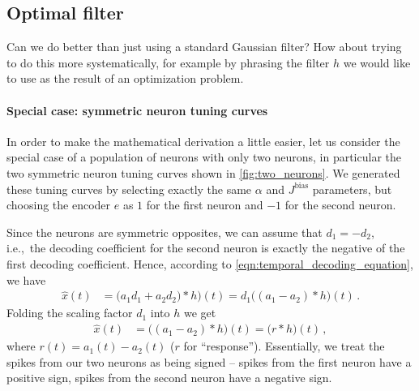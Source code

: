 \documentclass[10pt,letterpaper,oneside]{article}
\begin{document}
\subsection{Optimal filter}

Can we do better than just using a standard Gaussian filter? How about trying to do this more systematically, for example by phrasing the filter $h$ we would like to use as the result of an optimization problem.

\paragraph{Special case: symmetric neuron tuning curves}
In order to make the mathematical derivation a little easier, let us consider the special case of a population of neurons with only two neurons, in particular the two symmetric neuron tuning curves shown in \cref{fig:two_neurons}. We generated these tuning curves by selecting exactly the same $\alpha$ and $J^\mathrm{bias}$ parameters, but choosing the encoder $e$ as $1$ for the first neuron and $-1$ for the second neuron.

Since the neurons are symmetric opposites, we can assume that $d_1 = -d_2$, i.e.,~the decoding coefficient for the second neuron is exactly the negative of the first decoding coefficient. Hence, according to \cref{eqn:temporal_decoding_equation}, we have
\begin{align*}
	\hat x(t)
		&= \big(a_1 d_1 + a_2 d_2) \ast h \big)(t) =  d_1 \big((a_1 - a_2) \ast h \big)(t) \,.
\end{align*}
Folding the scaling factor $d_1$ into $h$ we get
\begin{align*}
	\hat x(t) &= \big((a_1 - a_2) \ast h \big)(t) = \big(r \ast h \big)(t) \,,
\end{align*}
where $r(t) = a_1(t) - a_2(t)$ ($r$ for \enquote{response}). Essentially, we treat the spikes from our two neurons as being signed -- spikes from the first neuron have a positive sign, spikes from the second neuron have a negative sign.

\end{document}
